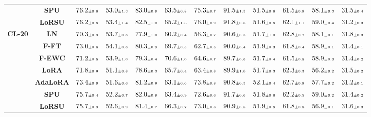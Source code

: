 \begin{table}
\begin{center}
\begin{small}
\begin{tabular}{l c c c c c c c c c c c}
& \textbf{SPU} & $76.2 \mtiny{\pm 0.6}$ & $53.0 \mtiny{\pm 1.3}$ & $83.0 \mtiny{\pm 0.8}$ & $63.5 \mtiny{\pm 0.8}$ & $75.3 \mtiny{\pm 0.7}$ & $91.5 \mtiny{\pm 1.5}$ & $51.5 \mtiny{\pm 0.6}$ & $61.5 \mtiny{\pm 0.8}$ & $58.1 \mtiny{\pm 0.3}$ & $31.5 \mtiny{\pm 0.4}$ \\
& \textbf{LoRSU} & $76.2 \mtiny{\pm 0.8}$ & $53.4 \mtiny{\pm 1.4}$ & $82.5 \mtiny{\pm 1.0}$ & $65.2 \mtiny{\pm 1.3}$ & $76.0 \mtiny{\pm 0.9}$ & $91.8 \mtiny{\pm 0.8}$ & $51.6 \mtiny{\pm 0.8}$ & $62.1 \mtiny{\pm 1.1}$ & $59.0 \mtiny{\pm 0.4}$ & $31.2 \mtiny{\pm 0.3}$ \\
\midrule
\multirow{7}{*}{\textbf{CL-20}} & \textbf{LN} & $70.3 \mtiny{\pm 0.9}$ & $53.7 \mtiny{\pm 0.6}$ & $77.9 \mtiny{\pm 1.0}$ & $60.2 \mtiny{\pm 0.4}$ & $56.3 \mtiny{\pm 0.7}$ & $90.6 \mtiny{\pm 0.3}$ & $51.7 \mtiny{\pm 1.0}$ & $62.8 \mtiny{\pm 0.7}$ & $58.1 \mtiny{\pm 0.1}$ & $31.8 \mtiny{\pm 0.3}$ \\
& \textbf{F-FT} & $73.0 \mtiny{\pm 0.6}$ & $54.1 \mtiny{\pm 0.6}$ & $80.3 \mtiny{\pm 0.9}$ & $69.7 \mtiny{\pm 0.5}$ & $62.7 \mtiny{\pm 0.5}$ & $90.0 \mtiny{\pm 0.4}$ & $51.9 \mtiny{\pm 0.3}$ & $61.8 \mtiny{\pm 0.4}$ & $58.9 \mtiny{\pm 0.1}$ & $31.4 \mtiny{\pm 0.1}$ \\
& \textbf{F-EWC} & $71.2 \mtiny{\pm 0.5}$ & $53.9 \mtiny{\pm 1.0}$ & $79.3 \mtiny{\pm 0.4}$ & $70.6 \mtiny{\pm 1.0}$ & $64.6 \mtiny{\pm 0.7}$ & $89.7 \mtiny{\pm 0.6}$ & $51.7 \mtiny{\pm 0.4}$ & $61.5 \mtiny{\pm 0.5}$ & $58.9 \mtiny{\pm 0.3}$ & $31.4 \mtiny{\pm 0.2}$ \\
& \textbf{LoRA} & $71.8 \mtiny{\pm 0.9}$ & $51.1 \mtiny{\pm 0.8}$ & $78.6 \mtiny{\pm 0.3}$ & $65.7 \mtiny{\pm 0.4}$ & $63.4 \mtiny{\pm 0.8}$ & $89.9 \mtiny{\pm 1.0}$ & $51.7 \mtiny{\pm 0.3}$ & $62.3 \mtiny{\pm 0.3}$ & $56.2 \mtiny{\pm 0.2}$ & $31.5 \mtiny{\pm 0.2}$ \\
& \textbf{AdaLoRA} & $73.4 \mtiny{\pm 0.8}$ & $51.6 \mtiny{\pm 0.6}$ & $81.2 \mtiny{\pm 0.9}$ & $63.1 \mtiny{\pm 0.6}$ & $73.8 \mtiny{\pm 0.8}$ & $90.8 \mtiny{\pm 0.5}$ & $52.1 \mtiny{\pm 0.4}$ & $62.7 \mtiny{\pm 0.8}$ & $57.7 \mtiny{\pm 0.2}$ & $31.2 \mtiny{\pm 0.1}$ \\
& \textbf{SPU} & $75.7 \mtiny{\pm 0.4}$ & $52.2 \mtiny{\pm 0.7}$ & $82.0 \mtiny{\pm 0.8}$ & $63.4 \mtiny{\pm 0.9}$ & $72.6 \mtiny{\pm 0.6}$ & $91.7 \mtiny{\pm 0.6}$ & $51.8 \mtiny{\pm 0.6}$ & $62.2 \mtiny{\pm 0.5}$ & $59.0 \mtiny{\pm 0.2}$ & $31.4 \mtiny{\pm 0.2}$ \\
& \textbf{LoRSU} & $75.7 \mtiny{\pm 0.9}$ & $52.6 \mtiny{\pm 0.9}$ & $81.4 \mtiny{\pm 0.7}$ & $66.3 \mtiny{\pm 0.7}$ & $73.0 \mtiny{\pm 0.8}$ & $90.9 \mtiny{\pm 0.8}$ & $51.9 \mtiny{\pm 0.8}$ & $61.8 \mtiny{\pm 0.8}$ & $56.9 \mtiny{\pm 0.1}$ & $31.6 \mtiny{\pm 0.3}$ \\

\end{tabular}
\end{small}
\end{center}
\end{table}
